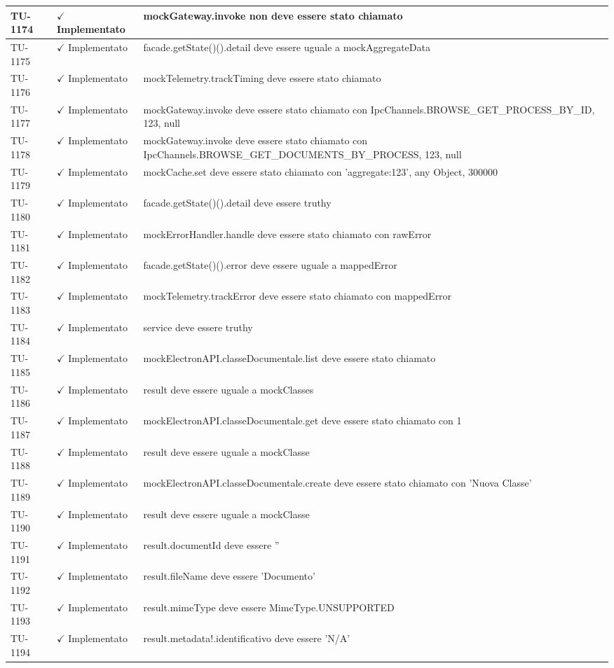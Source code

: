 ﻿\documentclass[a4paper,12pt]{article}
\newcommand{\ok}{\textcolor{green!60!black}{$\checkmark$ Implementato}}
\begin{document}
\begin{longtable}{|p{2cm}|p{3.5cm}|p{9.5cm}|}
\hline
TU-1174 & \ok & mockGateway.invoke non deve essere stato chiamato \\
\hline
TU-1175 & \ok & facade.getState()().detail deve essere uguale a mockAggregateData \\
\hline
TU-1176 & \ok & mockTelemetry.trackTiming deve essere stato chiamato \\
\hline
TU-1177 & \ok & mockGateway.invoke deve essere stato chiamato con IpcChannels.BROWSE\_GET\_PROCESS\_BY\_ID, 123, null \\
\hline
TU-1178 & \ok & mockGateway.invoke deve essere stato chiamato con IpcChannels.BROWSE\_GET\_DOCUMENTS\_BY\_PROCESS, 123, null \\
\hline
TU-1179 & \ok & mockCache.set deve essere stato chiamato con 'aggregate:123', any Object, 300000 \\
\hline
TU-1180 & \ok & facade.getState()().detail deve essere truthy \\
\hline
TU-1181 & \ok & mockErrorHandler.handle deve essere stato chiamato con rawError \\
\hline
TU-1182 & \ok & facade.getState()().error deve essere uguale a mappedError \\
\hline
TU-1183 & \ok & mockTelemetry.trackError deve essere stato chiamato con mappedError \\
\hline
TU-1184 & \ok & service deve essere truthy \\
\hline
TU-1185 & \ok & mockElectronAPI.classeDocumentale.list deve essere stato chiamato \\
\hline
TU-1186 & \ok & result deve essere uguale a mockClasses \\
\hline
TU-1187 & \ok & mockElectronAPI.classeDocumentale.get deve essere stato chiamato con 1 \\
\hline
TU-1188 & \ok & result deve essere uguale a mockClasse \\
\hline
TU-1189 & \ok & mockElectronAPI.classeDocumentale.create deve essere stato chiamato con 'Nuova Classe' \\
\hline
TU-1190 & \ok & result deve essere uguale a mockClasse \\
\hline
TU-1191 & \ok & result.documentId deve essere '' \\
\hline
TU-1192 & \ok & result.fileName deve essere 'Documento' \\
\hline
TU-1193 & \ok & result.mimeType deve essere MimeType.UNSUPPORTED \\
\hline
TU-1194 & \ok & result.metadata!.identificativo deve essere 'N/A' \\

\end{longtable}
\end{document}
